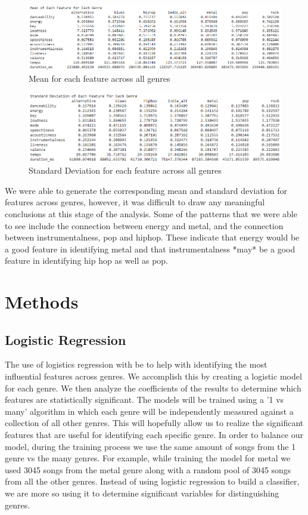 \documentclass[11pt, a4paper, twocolumn]{article}
\begin{document}
\begin{figure}[h!]
\centerline{\includegraphics[scale=0.3]{Stats_Mean}}
\caption{Mean for each feature across all genres}
\end{figure}
\begin{figure}[h!]
\centerline{\includegraphics[scale=0.3]{Stats_SD}}
\caption{Standard Deviation for each feature across all genres}
\end{figure}
We were able to generate the corresponding mean and standard deviation for features across genres, however, it was difficult to draw any meaningful conclusions at this stage of the analysis. Some of the patterns that we were able to see include the connection between energy and metal, and the connection between instrumentalness, pop and hiphop. These indicate that energy would be a good feature in identifying metal and that instrumentalness *may* be a good feature in identifying hip hop as well as pop. 
\section{Methods}
\subsection{Logistic Regression}
The use of logistics regression with be to help with identifying the most influential features across genres. We accomplish this by creating a logistic model for each genre. We then analyze the coefficients of the results to determine which features are statistically significant. The models will be trained using a '1 vs many' algorithm in which each genre will be independently measured against a collection of all other genres. This will hopefully allow us to realize the significant features that are useful for identifying each specific genre. 
In order to balance our model, during the training process we use the same amount of songs from the 1 genre vs the many genres. For example, while training the model for metal we used 3045 songs from the metal genre along with a random pool of 3045 songs from all the other genres. Instead of using logistic regression to build a classifier, we are more so using it to determine significant variables for distinguishing genres. 
\end{document}
